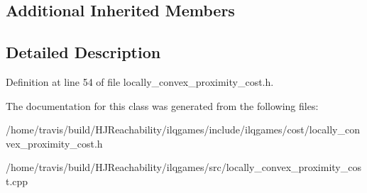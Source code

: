 \subsection*{Additional Inherited Members}


\subsection{Detailed Description}


Definition at line 54 of file locally\+\_\+convex\+\_\+proximity\+\_\+cost.\+h.



The documentation for this class was generated from the following files\+:\begin{DoxyCompactItemize}
\item 
/home/travis/build/\+H\+J\+Reachability/ilqgames/include/ilqgames/cost/locally\+\_\+convex\+\_\+proximity\+\_\+cost.\+h\item 
/home/travis/build/\+H\+J\+Reachability/ilqgames/src/locally\+\_\+convex\+\_\+proximity\+\_\+cost.\+cpp\end{DoxyCompactItemize}
